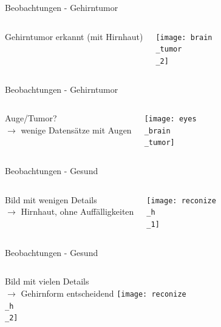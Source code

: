 \documentclass[ngerman,14pt,aspectratio=1610]{beamer}
\begin{document}
		\begin{frame}[t]{Beobachtungen - Gehirntumor}
			\begin{columns}[T, onlytextwidth]
				\vspace{90pt}
				Gehirntumor erkannt (mit Hirnhaut)
				
				\vspace{20pt}
				\texttt{[image: brain\\\_tumor\\\_2]}
			\end{columns}
		\end{frame}
	
		\begin{frame}[t]{Beobachtungen - Gehirntumor}			
			\begin{columns}[T, onlytextwidth]
				\vspace{60pt}
					Auge/Tumor? \\
					$\rightarrow$ wenige Datensätze mit Augen
				
				\vspace{20pt}
					\texttt{[image: eyes\\\_brain\\\_tumor]}
			\end{columns}
		\end{frame}
		
		\begin{frame}[t]{Beobachtungen - Gesund} 
			\begin{columns}[T, onlytextwidth]
				\vspace{50pt}
					Bild mit wenigen Details\\
					$\rightarrow$  Hirnhaut, ohne Auffälligkeiten 
				
					\vspace{20pt}
					\texttt{[image: reconize\\\_h\\\_1]}
			\end{columns}
		\end{frame}
		
		\begin{frame}[t]{Beobachtungen - Gesund} 
			\begin{columns}[T, onlytextwidth]
					\vspace{60pt}
					Bild mit vielen Details\\
					$\rightarrow$ Gehirnform entscheidend
					\vspace{20pt}
					\texttt{[image: reconize\\\_h\\\_2]}
			\end{columns}
		\end{frame}
		
\end{document}
